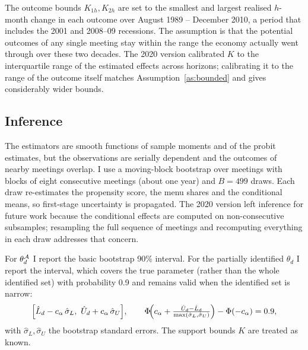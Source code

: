 The outcome bounds $K_{1h},K_{2h}$ are set to the smallest and largest realised $h$-month change in each outcome
over August 1989 -- December 2010, a period that includes the 2001 and 2008--09 recessions. The assumption is that
the potential outcomes of any single meeting stay within the range the economy actually went through over these
two decades. The 2020 version calibrated $K$ to the interquartile range of the estimated effects across horizons;
calibrating it to the range of the outcome itself matches Assumption~\ref{as:bounded} and gives considerably wider
bounds.

\subsection{Inference}

The estimators are smooth functions of sample moments and of the probit estimates, but the observations are
serially dependent and the outcomes of nearby meetings overlap. I use a moving-block bootstrap over meetings
\citep{kunsch1989} with blocks of eight consecutive meetings (about one year) and $B=499$ draws. Each draw
re-estimates the propensity score, the menu shares and the conditional means, so first-stage uncertainty is
propagated. The 2020 version left inference for future work because the conditional effects are computed on
non-consecutive subsamples; resampling the full sequence of meetings and recomputing everything in each draw
addresses that concern.

For $\theta_d^{\mathcal{A}}$ I report the basic bootstrap 90\% interval. For the partially identified $\theta_d$ I report the
\citet{imbens2004} interval, which covers the true parameter (rather than the whole identified set) with
probability 0.9 and remains valid when the identified set is narrow:
\[
\Bigl[\hat L_d-c_\alpha\,\hat\sigma_L,\ \hat U_d+c_\alpha\,\hat\sigma_U\Bigr],\qquad
\Phi\!\Bigl(c_\alpha+\tfrac{\hat U_d-\hat L_d}{\max(\hat\sigma_L,\hat\sigma_U)}\Bigr)-\Phi(-c_\alpha)=0.9,
\]
with $\hat\sigma_L,\hat\sigma_U$ the bootstrap standard errors. The support bounds $K$ are treated as known.
